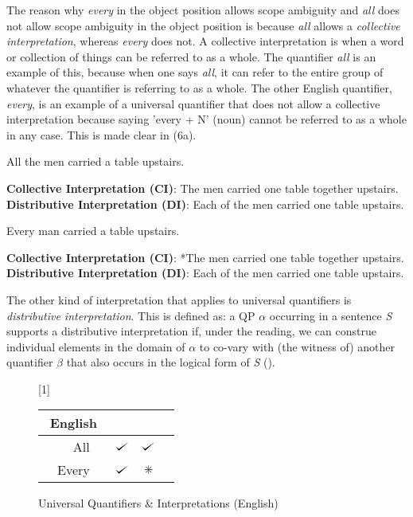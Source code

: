 \documentclass[english, 11pt]{article}
\newcommand{\dwork}{\text{\ding{83}}}
\newcommand{\vs}{\vspace{12pt}}  %
\def\checkmark{\tikz\fill[scale=0.4](0,.35) -- (.25,0) -- (1,.7) -- (.25,.15) -- cycle;}
\begin{document}
The reason why \emph{every} in the object position allows scope ambiguity and \emph{all} does not allow scope ambiguity in the object position is because \emph{all} allows a \emph{collective interpretation}, whereas \emph{every} does not. A collective interpretation is when a word or collection of things can be referred to as a whole. The quantifier \emph{all} is an example of this, because when one says \emph{all}, it can refer to the entire group of whatever the quantifier is referring to as a whole. The other English quantifier, \emph{every}, is an example of a universal quantifier that does not allow a collective interpretation because saying 'every + N' (noun) cannot be referred to as a whole in any case. This is made clear in (6a). 

\begin {exe}
	\ex 
		\begin {xlist}
			\ex All the men carried a table upstairs.
			\begin {xlist} 
				\ex \textbf{Collective Interpretation (CI)}: The men carried one table together upstairs.
				\ex \textbf{Distributive Interpretation (DI)}: Each of the men carried one table upstairs.
			\end {xlist}
			\ex Every man carried a table upstairs.
				\begin {xlist} 
					\ex \textbf{Collective Interpretation (CI)}: *The men carried one table together upstairs.
					\ex \textbf{Distributive Interpretation (DI)}: Each of the men carried one table upstairs.
				\end {xlist}
	\end {xlist}
\end {exe}
The other kind of interpretation that applies to universal quantifiers is \emph{distributive interpretation}. This is defined as: a QP $\alpha$ occurring in a sentence \emph{S} supports a distributive interpretation if, under the reading, we can construe individual elements in the domain of $\alpha$ to co-vary with (the witness of) another quantifier $\beta$ that also occurs in the logical form of \emph{S} (\cite{s3}).

\begin{figure}[h]
	\begin{center} \renewcommand*\arraystretch{1.2}
	\scalebox{1}[1]{\begin{tabular}[t]{|rrl||c|c|c|} \hline 
	\multicolumn{3}{|c||}{English} & \sc{Distributive Interpretation} & \sc{Collective Interpretation}  \\[0.5ex]
  	 	\hline & All 		& & $\checkmark$ & $\checkmark$ \\
		\hline & Every 	& & $\checkmark$ & $\dwork$ \\
   	 	\hline 
	\end{tabular}} \renewcommand*\arraystretch{1} \end{center}
	\vspace*{-5mm}
	\captionsetup{labelfont=bf}
	\caption[labelfont=bf]{Universal Quantifiers & Interpretations (English)}
\end{figure}
\vs
\end{document}
